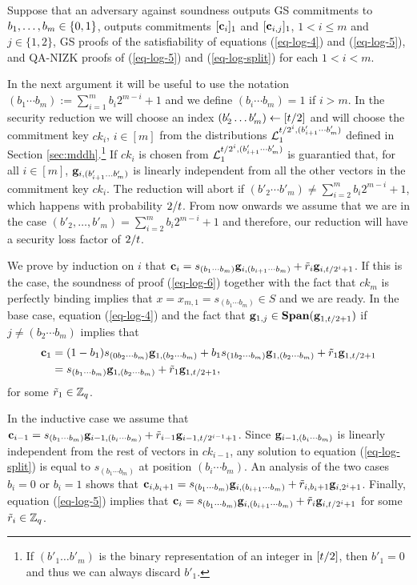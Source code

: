 Suppose that an adversary against soundness outputs GS commitments to \(b_1,\ldots,b_{m}\in\{0,1\}\), outputs commitments \([\mathbf{c}_i]_1\) and \([\mathbf{c}_{i,j}]_1\), \(1< i\leq m\) and \(j\in\{1,2\}\), GS proofs of the satisfiability of equations (\ref{eq-log-4}) and (\ref{eq-log-5}), and QA-NIZK proofs of (\ref{eq-log-5}) and (\ref{eq-log-split}) for each \(1<i<m\).

In the next argument it will be useful to use the notation \((b_1\cdots b_m):=\sum_{i=1}^{m}b_i2^{m-i}+1\) and we define \((b_i\cdots b_m)=1\) if \(i>m\).
In the security reduction we will choose an index \((b'_2\ldots b'_m)\gets[t /2]\) and will choose the commitment key \(ck_i\), \(i\in[m]\) from the distributions \(\mathcal{L}_1^{t /2^i,(b'_{i+1}\cdots b'_m)}\) defined in Section \ref{sec:mddh}.\footnote{If \((b'_1\ldots b'_m)\) is the binary representation of an integer in \([t /2]\), then \(b'_1=0\) and thus we can always discard \(b'_1\).}  If $ck_i$ is chosen from $\mathcal{L}_1^{t /2^i,(b'_{i+1}\cdots b'_m)}$ is guarantied that, for all \(i\in[m]\), \(\mathbf{g}_{i,(b'_{i+1}\ldots b'_m)}\) is linearly independent from all the other vectors in the commitment key \(ck_i\). The reduction will abort if \((b'_2\cdots b'_m)\neq\sum_{i=2}^{m} b_i2^{m-i}+1\), which happens with probability \(2/t \). From now onwards we assume that we are in the case \((b'_2,\ldots,b'_m)=\sum_{i=2}^{m} b_i2^{m-i}+1\) and therefore, our reduction will have a security loss factor of \(2/t \).

We prove by induction on \(i\) that \(\mathbf{c}_i=s_{(b_1\cdots b_m)}\mathbf{g}_{i,(b_{i+1}\cdots b_m)}+\tilde{r}_i\mathbf{g}_{i,t /2^i+1}\). If this is the case, the soundness of proof (\ref{eq-log-6}) together with the fact that \(ck_m\) is perfectly binding implies that \(x=x_{m,1}=s_{(b_1\cdots b_m)}\in S\) and we are ready. In the base case, equation (\ref{eq-log-4}) and the fact that \(\mathbf{g}_{1,j}\in\mathbf{Span}(\mathbf{g}_{1,t /2+1})\) if \(j\neq (b_2\cdots b_m)\) implies that 
\begin{align*}
\mathbf{c}_1 &= (1-b_1)s_{(0b_2\cdots b_m)} \mathbf{g}_{1,(b_2\cdots b_m)}+b_1s_{(1b_2\cdots b_m)}\mathbf{g}_{1,(b_2\cdots b_m)}+\tilde{r}_1\mathbf{g}_{1,t /2+1}\\
&=s_{(b_1\cdots b_m)}\mathbf{g}_{1,(b_2\cdots b_m)}+\tilde{r}_1\mathbf{g}_{1,t /2+1},
\end{align*} for some \(\tilde{r}_1\in\mathbb{Z}_q\).

In the inductive case we assume that \(\mathbf{c}_{i-1}=s_{(b_1\cdots b_m)}\mathbf{g}_{i-1,(b_i\cdots b_m)}+\tilde{r}_{i-1}\mathbf{g}_{i-1,t /2^{i-1}+1}\). Since \(\mathbf{g}_{i-1,(b_i\cdots b_m)}\) is linearly independent from the rest of vectors in \(ck_{i-1}\), any solution to equation (\ref{eq-log-split}) is equal to \(s_{(b_1\cdots b_m)}\) at position \((b_i\cdots b_m)\). An analysis of the two cases \(b_i=0\) or \(b_i=1\) shows that \(\mathbf{c}_{i,b_i+1}=s_{(b_1\cdots b_m)}\mathbf{g}_{i,(b_{i+1}\cdots b_m)}+\tilde{r}_{i,b_i+1}\mathbf{g}_{i,2^i+1}\). Finally, equation (\ref{eq-log-5}) implies that \(\mathbf{c}_i=s_{(b_1\cdots b_m)}\mathbf{g}_{i,(b_{i+1}\cdots b_m)}+\tilde{r}_i\mathbf{g}_{i,t /2^i+1}\) for some \(\tilde{r}_{i}\in\mathbb{Z}_q\).

